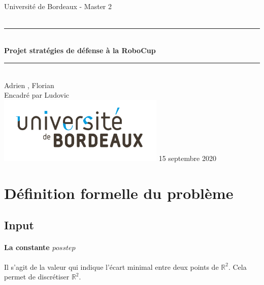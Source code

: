 \documentclass{article}
\begin{document}
\begin{titlepage}
    ~ \vfill
    \begin{center}
      \LARGE  Université de Bordeaux - Master 2\\[1.5cm]

      {\Large \bfseries {}}\\[0.5cm]

      \rule{\linewidth}{0.5mm}\\[0.4cm] {\Huge \bfseries Projet stratégies de défense à la RoboCup \\[0.2cm]} \rule{\linewidth}{0.5mm}\\[1.5cm] {
      \Large Adrien , Florian }\\[0.5cm]

                {\large Encadré par Ludovic }\\ \vfill
                \includegraphics[width = 300px]{logo.jpg} \vfill
                                {\large 15 septembre 2020}
    \end{center}
\end{titlepage}

\section{Définition formelle du problème}


\subsection{Input}

\paragraph{La constante $posstep$} Il s'agit de la valeur qui indique l'écart minimal entre deux points de $\mathbb{R}^2$. Cela permet de discrétiser $\mathbb{R}^2$.
\end{document}
